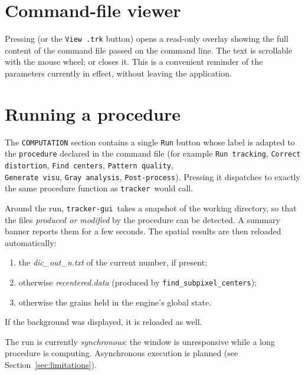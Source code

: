 \documentclass{simpledoc}
\newcommand{\gui}{\screen{tracker-gui}}
\newcommand{\cli}{\screen{tracker}}
\newcommand{\file}[1]{\textit{\color{myblue}#1}}
\newcommand{\screen}[1]{\texttt{\color{myblue}#1}}
\newcommand{\scr}[1]{\texttt{\color{myblue}#1}}
\newcommand{\key}[1]{\fbox{\color{myblue}#1}}
\begin{document}
\section{Command-file viewer}

\marginlabel{\key{T} \scr{View .trk}}
Pressing \key{T} (or the \screen{View .trk} button) opens a read-only overlay showing the full content
of the command file passed on the command line. The text is scrollable with the mouse wheel; \key{T}
or \key{Esc} closes it. This is a convenient reminder of the parameters currently in effect, without
leaving the application.

\section{Running a procedure}
\label{sec:run}

\marginlabel{\scr{COMPUTATION}}
The \scr{COMPUTATION} section contains a single \screen{Run} button whose label is adapted to the
\scr{procedure} declared in the command file (for example \screen{Run tracking},
\screen{Correct distortion}, \screen{Find centers}, \screen{Pattern quality},\\ \screen{Generate visu},
\screen{Gray analysis}, \screen{Post-process}). Pressing it dispatches to exactly the same procedure
function as \cli\ would call.

Around the run, \gui\ takes a snapshot of the working directory, so that the files \emph{produced or
modified} by the procedure can be detected. A summary banner reports them for a few seconds. The
spatial results are then reloaded automatically:

\begin{enumerate}
  \item the \file{dic\_out\_\textit{n}.txt} of the current number, if present;
  \item otherwise \file{recentered.data} (produced by \scr{find\_subpixel\_centers});
  \item otherwise the grains held in the engine's global state.
\end{enumerate}

If the background was displayed, it is reloaded as well.

\attention The run is currently \emph{synchronous}: the window is unresponsive while a long procedure
is computing. Asynchronous execution is planned (see Section~\ref{sec:limitations}).
\end{document}
